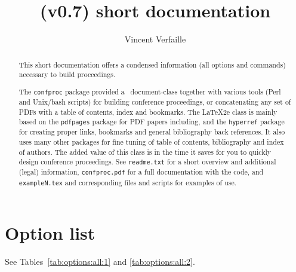 \documentclass{article}
\title{\file{confproc} (v0.7) short documentation}
\author{Vincent Verfaille}
\newcommand{\file}[1]{\texttt{#1}}
\newcommand{\filename}{confproc}
\newcommand{\package}[1]{\texttt{#1}}
\begin{document}
\maketitle

\begin{abstract}
    This short documentation offers a condensed information (all options and 
    commands) necessary to build proceedings.

    The \package{\filename} package provided a \LaTeXe\ document-class 
    together with various tools (Perl and Unix/bash scripts) for 
    building conference proceedings, or concatenating any set of 
    PDFs with a table of contents, index and bookmarks. The LaTeX2e 
    class is mainly based on the \package{pdfpages} package for PDF papers including, and 
    the \package{hyperref} package for creating proper links, bookmarks and 
    general bibliography back references. It also uses many other 
    packages for fine tuning of table of contents, bibliography and 
    index of authors.  The added value of this class is in the time it 
    saves for you to quickly design conference proceedings.
    See \file{readme.txt} for a short overview and additional (legal) 
    information, \file{confproc.pdf} for a full documentation with the code, 
    and \file{exampleN.tex} and corresponding files and 
    scripts for examples of use.   
\end{abstract}

\section{Option list}

See Tables~\ref{tab:options:all:1} and \ref{tab:options:all:2}.
\end{document}
